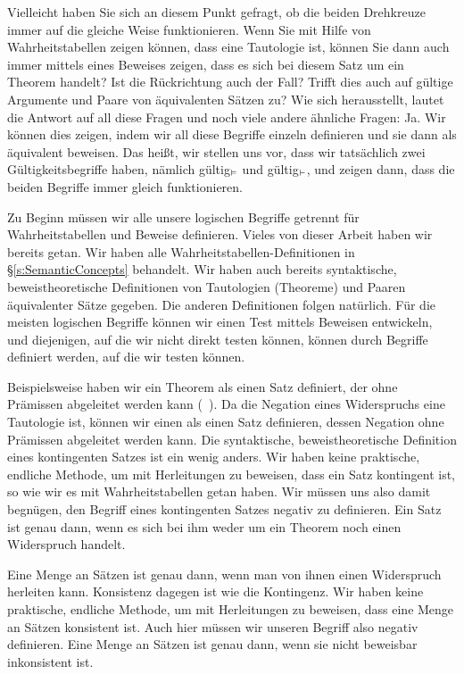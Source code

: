 Vielleicht haben Sie sich an diesem Punkt gefragt, ob die beiden Drehkreuze immer auf die gleiche Weise funktionieren. Wenn Sie mit Hilfe von Wahrheitstabellen zeigen können, dass  eine Tautologie ist, können Sie dann auch immer mittels eines Beweises zeigen, dass es sich bei diesem Satz um ein Theorem handelt? Ist die Rückrichtung auch der Fall? Trifft dies auch auf gültige Argumente und Paare von äquivalenten Sätzen zu? Wie sich herausstellt, lautet die Antwort auf all diese Fragen und noch viele andere ähnliche Fragen: Ja. Wir können dies zeigen, indem wir all diese Begriffe einzeln definieren und sie dann als äquivalent beweisen. Das hei{\ss}t, wir stellen uns vor, dass wir tatsächlich zwei Gültigkeitsbegriffe haben, nämlich gültig$_{\vDash}$ und gültig$_{\vdash}$, und zeigen dann, dass die beiden Begriffe immer gleich funktionieren. 

Zu Beginn müssen wir alle unsere logischen Begriffe getrennt für Wahrheitstabellen und Beweise definieren. Vieles von dieser Arbeit haben wir bereits getan. Wir haben alle Wahrheitstabellen-Definitionen in \S\ref{s:SemanticConcepts} behandelt. Wir haben auch bereits syntaktische, beweistheoretische Definitionen von Tautologien (Theoreme) und Paaren äquivalenter Sätze gegeben. Die anderen Definitionen folgen natürlich. Für die meisten logischen Begriffe können wir einen Test mittels Beweisen entwickeln, und diejenigen, auf die wir nicht direkt testen können, können durch Begriffe definiert werden, auf die wir testen können.

Beispielsweise haben wir ein Theorem als einen Satz definiert, der ohne Prämissen abgeleitet werden kann (~\pageref{def:syntactic_tautology_in_sl}). Da die Negation eines Widerspruchs eine Tautologie ist, können wir einen \label{def:syntactic_contradiction_in_sl} als einen Satz definieren, dessen Negation ohne Prämissen abgeleitet werden kann. Die syntaktische, beweistheoretische Definition eines kontingenten Satzes ist ein wenig anders. Wir haben keine praktische, endliche Methode, um mit Herleitungen zu beweisen, dass ein Satz kontingent ist, so wie wir es mit Wahrheitstabellen getan haben. Wir müssen uns also damit begnügen, den Begriff eines kontingenten Satzes negativ zu definieren. Ein Satz ist \label{def:syntactically_contingent_in_sl} genau dann, wenn es sich bei ihm weder um ein Theorem noch einen Widerspruch handelt. 

Eine Menge an Sätzen ist  \label{def:syntactically_inconsistent_ in_sl} genau dann, wenn man von ihnen einen Widerspruch herleiten kann. Konsistenz dagegen ist wie die Kontingenz. Wir haben keine praktische, endliche Methode, um mit Herleitungen zu beweisen, dass eine Menge an Sätzen konsistent ist. Auch hier müssen wir unseren Begriff also negativ definieren. Eine Menge an Sätzen ist \label{def:syntactically consistent in SL} genau dann, wenn sie nicht beweisbar inkonsistent ist.

